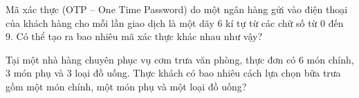\begin{bt}%
	Mã xác thực (OTP – One Time Password) do một ngân hàng gửi vào điện thoại của khách hàng cho mỗi lần giao dịch là một dãy 6 kí tự từ các chữ số từ 0 đến 9. Có thể tạo ra bao nhiêu mã  xác thực khác nhau như vậy?
\end{bt}

\begin{bt}%
	Tại một nhà hàng chuyên phục vụ cơm trưa văn phòng, thực đơn có $6$ món chính, $3$ món phụ và $3$ loại đồ uống. Thực khách có bao nhiêu cách lựa chọn bữa trưa gồm một món chính, một món phụ  và một loại đồ uống?
\end{bt}

